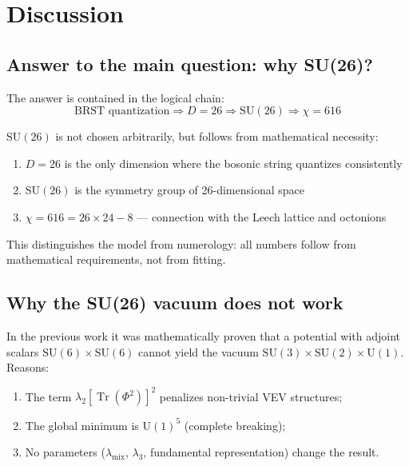\documentclass[12pt,a4paper,twoside]{article}
\DeclareMathOperator{\Tr}{Tr}
\newcommand{\SU}{\mathrm{SU}}
\newcommand{\Uone}{\mathrm{U}(1)}
\theoremstyle{definition}
\begin{document}
\section{Discussion}
\label{sec:discussion}

\subsection{Answer to the main question: why SU(26)?}

The answer is contained in the logical chain:
\begin{equation}
\boxed{
\text{BRST quantization} \Rightarrow D=26 \Rightarrow \SU(26) \Rightarrow \chi=616
}
\end{equation}

$\SU(26)$ is not chosen arbitrarily, but follows from mathematical necessity:
\begin{enumerate}
    \item $D=26$ is the only dimension where the bosonic string quantizes consistently
    \item $\SU(26)$ is the symmetry group of 26-dimensional space
    \item $\chi = 616 = 26 \times 24 - 8$ — connection with the Leech lattice and octonions
\end{enumerate}

This distinguishes the model from numerology: all numbers follow from mathematical requirements, not from fitting.

\subsection{Why the SU(26) vacuum does not work}

In the previous work \cite{Matershov:2026f} it was mathematically proven that a potential with adjoint scalars $\SU(6) \times \SU(6)$ cannot yield the vacuum $\SU(3) \times \SU(2) \times \Uone$. Reasons:

\begin{enumerate}
    \item The term $\lambda_2[\Tr(\Phi^2)]^2$ penalizes non-trivial VEV structures;
    \item The global minimum is $\Uone^5$ (complete breaking);
    \item No parameters ($\lambda_{\text{mix}}$, $\lambda_3$, fundamental representation) change the result.
\end{enumerate}
\end{document}
